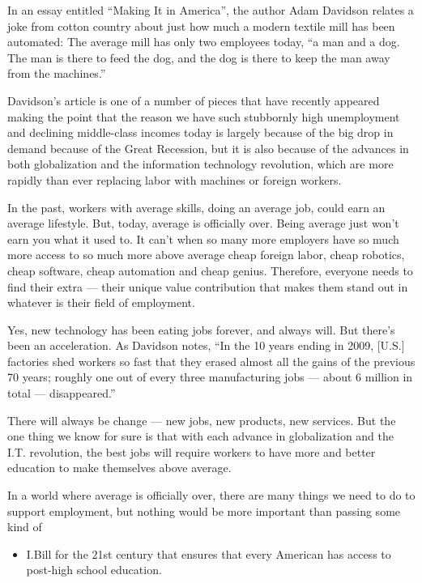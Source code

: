 \documentclass[UTF8,11pt]{ctexart}
\begin{document}
In an essay entitled “Making It in America”, the author Adam Davidson relates a joke from cotton country about just how much a modern textile mill has been automated: The average mill has only two employees today, “a man and a dog. The man is there to feed the dog, and the dog is there to keep the man away from the machines.”


Davidson’s article is one of a number of pieces that have recently appeared making the point that the reason we have such stubbornly high unemployment and declining middle-class incomes today is largely because of the big drop in demand because of the Great Recession, but it is also because of the advances in both globalization and the information technology revolution, which are more rapidly than ever replacing labor with machines or foreign workers.


In the past, workers with average skills, doing an average job, could earn an average lifestyle. But, today, average is officially over. Being average just won’t earn you what it used to. It can’t when so many more employers have so much more access to so much more above average cheap foreign labor, cheap robotics, cheap software, cheap automation and cheap genius. Therefore, everyone needs to find their extra — their unique value contribution that makes them stand out in whatever is their field of employment.


Yes, new technology has been eating jobs forever, and always will. But there’s been an acceleration. As Davidson notes, “In the 10 years ending in 2009, [U.S.] factories shed workers so fast that they erased almost all the gains of the previous 70 years; roughly one out of every three manufacturing jobs — about 6 million in total — disappeared.”


There will always be change — new jobs, new products, new services. But the one thing we know for sure is that with each advance in globalization and the I.T. revolution, the best jobs will require workers to have more and better education to make themselves above average.


In a world where average is officially over, there are many things we need to do to support employment, but nothing would be more important than passing some kind of


\begin{itemize}[leftmargin=2em,itemsep=.2em,topsep=.4em]\item[G.] I.Bill for the 21st century that ensures that every American has access to post-high school education.
\end{itemize}
\end{document}
